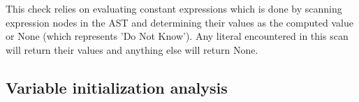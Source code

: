 \documentclass[12pt]{article}
\begin{document}
This check relies on evaluating constant expressions which is done by scanning expression
nodes in the AST and determining their values as the computed value or None
(which represents 'Do Not Know'). Any literal encountered in this scan will return their
values and anything else will return None.

\subsection{Variable initialization analysis}
\end{document}

